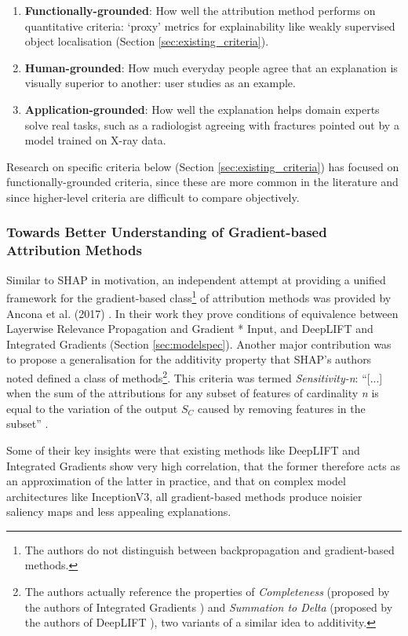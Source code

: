 \documentclass[main]{subfiles}
\begin{document}
\begin{enumerate}
\item \textbf{Functionally-grounded}: How well the attribution method performs on quantitative criteria: `proxy' metrics for explainability like weakly supervised object localisation (Section \ref{sec:existing_criteria}).
\item \textbf{Human-grounded}: How much everyday people agree that an explanation is visually superior to another: user studies as an example.
\item \textbf{Application-grounded}: How well the explanation helps domain experts solve real tasks, such as a radiologist agreeing with fractures pointed out by a model trained on X-ray data.

\end{enumerate}

Research on specific criteria below (Section \ref{sec:existing_criteria}) has focused on functionally-grounded criteria, since these are more common in the literature and since higher-level criteria are difficult to compare objectively.

\subsubsection{Towards Better Understanding of Gradient-based Attribution Methods \cite{ancona}}
Similar to SHAP in motivation, an independent attempt at providing a unified framework for the gradient-based class\footnote{The authors do not distinguish between backpropagation and gradient-based methods.} of attribution methods was provided by Ancona et al. (2017) \cite{ancona}. In their work they prove conditions of equivalence between Layerwise Relevance Propagation and Gradient * Input, and DeepLIFT and Integrated Gradients (Section \ref{sec:modelspec}). Another major contribution was to propose a generalisation for the additivity property that SHAP's authors noted defined a class of methods\footnote{The authors actually reference the properties of \textit{Completeness} (proposed by the authors of Integrated Gradients \cite{integrated}) and \textit{Summation to Delta} (proposed by the authors of DeepLIFT \cite{deeplift}), two variants of a similar idea to additivity.}. This criteria was termed \textit{Sensitivity-n}: ``[...] when the sum of the attributions for any subset of features of cardinality \textit{n} is equal to the variation of the output $S_{C}$ caused by removing features in the subset'' \cite{ancona}.

Some of their key insights were that existing methods like DeepLIFT and Integrated Gradients show very high correlation, that the former therefore acts as an approximation of the latter in practice, and that on complex model architectures like InceptionV3, all gradient-based methods produce noisier saliency maps and less appealing explanations.
\end{document}
